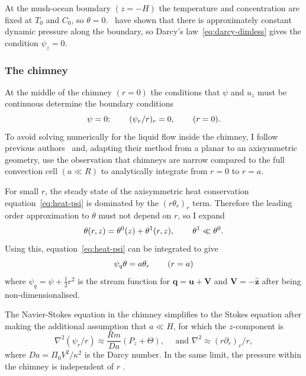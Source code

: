 \documentclass[11pt]{proc}
\begin{document}
At the mush-ocean boundary $(z=-H)$ the temperature and concentration are fixed at $T_0$ and $C_0$, so $\theta=0$.~\citet*{emms-fowler-94} have shown that there is approximately constant dynamic pressure along the boundary, so Darcy's law~\eqref{eq:darcy-dimless} gives the condition $\psi_z = 0$. 

\subsubsection{The chimney}
At the middle of the chimney $(r=0)$ the conditions that $\psi$ and $u_z$ must be continuous determine the boundary conditions 
\begin{equation}
\label{eq:axi-chimney-bcs}
\psi = 0; \hspace{5ex} (\psi_r/r)_r = 0,   \hspace{5ex} (r=0).
\end{equation}
To avoid solving numerically for the liquid flow inside the chimney, I follow previous authors~\citep*{schulze-worster-98,chung-worster-02,wells-et-al-10} and, adapting their method from a planar to an axisymmetric geometry, use the observation that chimneys are narrow compared to the full convection cell $(a\ll R)$ to analytically integrate from $r=0$ to $r=a$. 

For small $r$, the steady state of the axisymmetric heat conservation equation~\ref{eq:heat-psi} is dominated by the $(r \theta_r)_r$ term. Therefore the leading order approximation to $\theta$ must not depend on $r$, so I expand
\begin{equation}
\label{eq:theta-approx}
\theta(r,z) = \theta^0(z) + \theta^1(r,z), \hspace{5ex} \theta^1 \ll \theta^0.
\end{equation}
Using this, equation~\eqref{eq:heat-psi} can be integrated to give
\begin{equation}
\label{eq:theta-a-bc}
\psi_q \theta = a \theta_r   \hspace{5ex} (r=a)
\end{equation}
where $\psi_q = \psi + \frac{1}{2} r^2$ is the stream function for $\mathbf{q} = \mathbf{u} + \mathbf{V}$ and $\mathbf{V} = - \mathbf{\hat{z}}$ after being non-dimensionalised.

The Navier-Stokes equation in the chimney simplifies to the Stokes equation after making the additional assumption that $a \ll H$, for which the $z$-component is
\begin{equation}
\label{eq:stokes-channel}
\nabla^2 (\psi_r/r) \approx \frac{Rm}{Da} \left(P_z + \Theta \right), \quad \text{ and } \nabla^2 \approx (r \partial_r)_r/r,
\end{equation}
where $Da=\Pi_0 V^2 / \kappa^2$ is the Darcy number. In the same limit, the pressure within the chimney is independent of $r$ \citep*{schulze-worster-98}.
\end{document}
